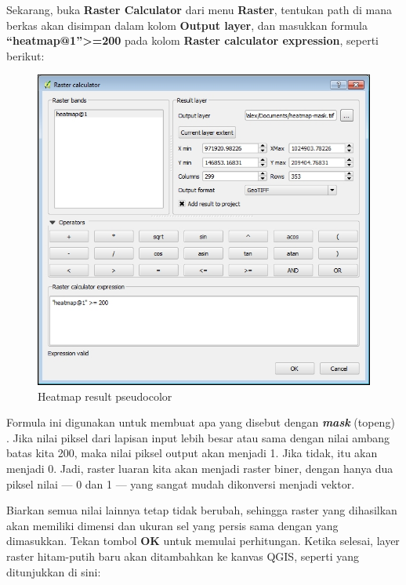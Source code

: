 \documentclass[]{book}
\begin{document}
Sekarang, buka \textbf{Raster Calculator} dari menu \textbf{Raster}, tentukan path di mana berkas akan disimpan dalam kolom \textbf{Output layer}, dan masukkan formula \textbf{``heatmap@1''\textgreater{}=200} pada kolom \textbf{Raster calculator expression}, seperti berikut:

\begin{figure}

{\centering \includegraphics[width=0.8\linewidth]{images/04/fig78} 

}

\caption{Heatmap result  pseudocolor}\label{fig:fig1478}
\end{figure}

Formula ini digunakan untuk membuat apa yang disebut dengan \textbf{\emph{mask}} (topeng) . Jika nilai piksel dari lapisan input lebih besar atau sama dengan nilai ambang batas kita 200, maka nilai piksel output akan menjadi 1. Jika tidak, itu akan menjadi 0. Jadi, raster luaran kita akan menjadi raster biner, dengan hanya dua piksel nilai --- 0 dan 1 --- yang sangat mudah dikonversi menjadi vektor.

Biarkan semua nilai lainnya tetap tidak berubah, sehingga raster yang dihasilkan akan memiliki dimensi dan ukuran sel yang persis sama dengan yang dimasukkan. Tekan tombol \textbf{OK} untuk memulai perhitungan. Ketika selesai, layer raster hitam-putih baru akan ditambahkan ke kanvas QGIS, seperti yang ditunjukkan di sini:
\end{document}
